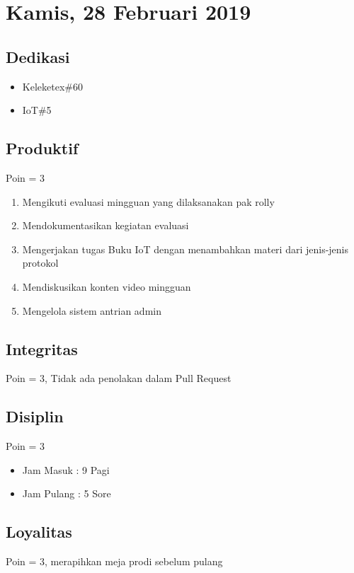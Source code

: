 \section{Kamis, 28 Februari 2019}
\subsection{Dedikasi}
\begin{itemize}
\item Keleketex\#60
\item IoT\#5
\end{itemize}
\subsection{Produktif}
Poin = 3 
\begin{enumerate}
\item Mengikuti evaluasi mingguan yang dilaksanakan pak rolly
\item Mendokumentasikan kegiatan evaluasi
\item Mengerjakan tugas Buku IoT dengan menambahkan materi dari jenis-jenis protokol
\item Mendiskusikan konten video mingguan
\item Mengelola sistem antrian admin
\end{enumerate}
\subsection{Integritas}
Poin = 3, Tidak ada penolakan dalam Pull Request
\subsection{Disiplin}
Poin = 3
\begin{itemize}
\item Jam Masuk : 9 Pagi
\item Jam Pulang : 5 Sore
\end{itemize}
\subsection{Loyalitas}
Poin = 3, merapihkan meja prodi sebelum pulang







